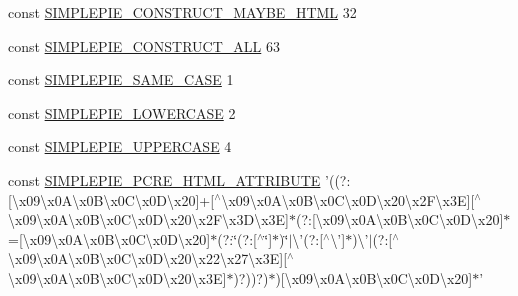 \begin{DoxyCompactItemize}
\item 
const \hyperlink{simplepie_8inc_aa561f1c03275b8dd5c7ed3ed7621b256}{S\-I\-M\-P\-L\-E\-P\-I\-E\-\_\-\-C\-O\-N\-S\-T\-R\-U\-C\-T\-\_\-\-M\-A\-Y\-B\-E\-\_\-\-H\-T\-M\-L} 32
\item 
const \hyperlink{simplepie_8inc_a46a4b553855f2bd1aeb110fcbc4ad1ca}{S\-I\-M\-P\-L\-E\-P\-I\-E\-\_\-\-C\-O\-N\-S\-T\-R\-U\-C\-T\-\_\-\-A\-L\-L} 63
\item 
const \hyperlink{simplepie_8inc_ad80a8b322741dea8352381f19b50cb59}{S\-I\-M\-P\-L\-E\-P\-I\-E\-\_\-\-S\-A\-M\-E\-\_\-\-C\-A\-S\-E} 1
\item 
const \hyperlink{simplepie_8inc_ac11935cc7850cd942419326db336c822}{S\-I\-M\-P\-L\-E\-P\-I\-E\-\_\-\-L\-O\-W\-E\-R\-C\-A\-S\-E} 2
\item 
const \hyperlink{simplepie_8inc_a62ecba655e871e25658db827450dc75e}{S\-I\-M\-P\-L\-E\-P\-I\-E\-\_\-\-U\-P\-P\-E\-R\-C\-A\-S\-E} 4
\item 
const \hyperlink{simplepie_8inc_ae8d34a93fac87ed8c4090acddfcf9d67}{S\-I\-M\-P\-L\-E\-P\-I\-E\-\_\-\-P\-C\-R\-E\-\_\-\-H\-T\-M\-L\-\_\-\-A\-T\-T\-R\-I\-B\-U\-T\-E} '((?\-:\mbox{[}\textbackslash{}x09\textbackslash{}x0\-A\textbackslash{}x0\-B\textbackslash{}x0\-C\textbackslash{}x0\-D\textbackslash{}x20\mbox{]}+\mbox{[}$^\wedge$\textbackslash{}x09\textbackslash{}x0\-A\textbackslash{}x0\-B\textbackslash{}x0\-C\textbackslash{}x0\-D\textbackslash{}x20\textbackslash{}x2\-F\textbackslash{}x3\-E\mbox{]}\mbox{[}$^\wedge$\textbackslash{}x09\textbackslash{}x0\-A\textbackslash{}x0\-B\textbackslash{}x0\-C\textbackslash{}x0\-D\textbackslash{}x20\textbackslash{}x2\-F\textbackslash{}x3\-D\textbackslash{}x3\-E\mbox{]}$\ast$(?\-:\mbox{[}\textbackslash{}x09\textbackslash{}x0\-A\textbackslash{}x0\-B\textbackslash{}x0\-C\textbackslash{}x0\-D\textbackslash{}x20\mbox{]}$\ast$=\mbox{[}\textbackslash{}x09\textbackslash{}x0\-A\textbackslash{}x0\-B\textbackslash{}x0\-C\textbackslash{}x0\-D\textbackslash{}x20\mbox{]}$\ast$(?\-:\char`\"{}(?\-:\mbox{[}$^\wedge$\char`\"{}\mbox{]}$\ast$)\char`\"{}$|$\textbackslash{}'(?\-:\mbox{[}$^\wedge$\textbackslash{}'\mbox{]}$\ast$)\textbackslash{}'$|$(?\-:\mbox{[}$^\wedge$\textbackslash{}x09\textbackslash{}x0\-A\textbackslash{}x0\-B\textbackslash{}x0\-C\textbackslash{}x0\-D\textbackslash{}x20\textbackslash{}x22\textbackslash{}x27\textbackslash{}x3\-E\mbox{]}\mbox{[}$^\wedge$\textbackslash{}x09\textbackslash{}x0\-A\textbackslash{}x0\-B\textbackslash{}x0\-C\textbackslash{}x0\-D\textbackslash{}x20\textbackslash{}x3\-E\mbox{]}$\ast$)?))?)$\ast$)\mbox{[}\textbackslash{}x09\textbackslash{}x0\-A\textbackslash{}x0\-B\textbackslash{}x0\-C\textbackslash{}x0\-D\textbackslash{}x20\mbox{]}$\ast$'

\end{DoxyCompactItemize}
